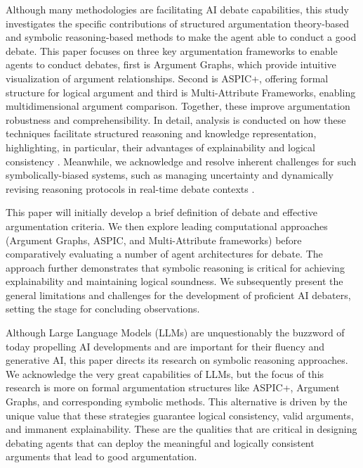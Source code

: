 \documentclass[conference]{IEEEtran}
\begin{document}
Although many methodologies are facilitating AI debate capabilities, this study investigates the specific contributions of structured argumentation theory-based and symbolic reasoning-based methods to make the agent able to conduct a good debate. This paper focuses on three key argumentation frameworks to enable agents to conduct debates, first is Argument Graphs, which provide intuitive visualization of argument relationships. Second is ASPIC+, offering formal structure for logical argument and third is Multi-Attribute Frameworks, enabling multidimensional argument comparison. Together, these improve argumentation robustness and comprehensibility. In detail, analysis is conducted on how these techniques facilitate structured reasoning and knowledge representation, highlighting, in particular, their advantages of explainability and logical consistency \cite{kasif2024trilogy}. Meanwhile, we acknowledge and resolve inherent challenges for such symbolically-biased systems, such as managing uncertainty and dynamically revising reasoning protocols in real-time debate contexts \cite{kasif2024trilogy}.

This paper will initially develop a brief definition of debate and effective argumentation criteria. We then explore leading computational approaches (Argument Graphs, ASPIC, and Multi-Attribute frameworks) before comparatively evaluating a number of agent architectures for debate. The approach further demonstrates that symbolic reasoning is critical for achieving explainability and maintaining logical soundness. We subsequently present the general limitations and challenges for the development of proficient AI debaters, setting the stage for concluding observations.

Although Large Language Models (LLMs) are unquestionably the buzzword of today propelling AI developments and are important for their fluency and generative AI, this paper directs its research on symbolic reasoning approaches. We acknowledge the very great capabilities of LLMs, but the focus of this research is more on formal argumentation structures like ASPIC+, Argument Graphs, and corresponding symbolic methods. This alternative is driven by the unique value that these strategies guarantee logical consistency, valid arguments, and immanent explainability. These are the qualities that are critical in designing debating agents that can deploy the meaningful and logically consistent arguments that lead to good argumentation.
\end{document}
